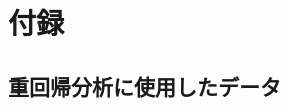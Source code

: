 \documentclass[../../../main]{subfiles}
\begin{document}
\appendix

\section{付録}
\subsection{重回帰分析に使用したデータ}

\end{document}
